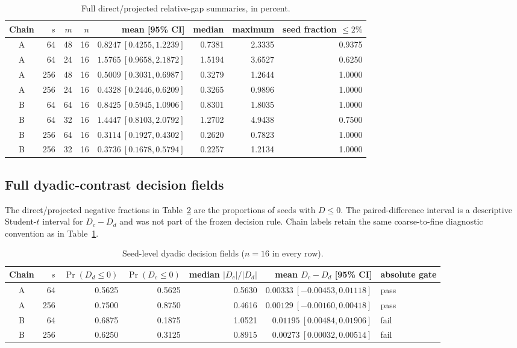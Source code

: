 \begin{table}[H]
\centering
\caption{Full direct/projected relative-gap summaries, in percent.}
\label{tab:r061-gap-full}
\scriptsize
\begin{tabular}{crrrrrrr}
\toprule
Chain & $s$ & $m$ & $n$ & mean [95\% CI] & median & maximum & seed fraction $\leq2\%$\\
\midrule
A & 64  & 48 & 16 & $0.8247\ [0.4255,1.2239]$ & 0.7381 & 2.3335 & 0.9375\\
A & 64  & 24 & 16 & $1.5765\ [0.9658,2.1872]$ & 1.5194 & 3.6527 & 0.6250\\
A & 256 & 48 & 16 & $0.5009\ [0.3031,0.6987]$ & 0.3279 & 1.2644 & 1.0000\\
A & 256 & 24 & 16 & $0.4328\ [0.2446,0.6209]$ & 0.3265 & 0.9896 & 1.0000\\
B & 64  & 64 & 16 & $0.8425\ [0.5945,1.0906]$ & 0.8301 & 1.8035 & 1.0000\\
B & 64  & 32 & 16 & $1.4447\ [0.8103,2.0792]$ & 1.2702 & 4.9438 & 0.7500\\
B & 256 & 64 & 16 & $0.3114\ [0.1927,0.4302]$ & 0.2620 & 0.7823 & 1.0000\\
B & 256 & 32 & 16 & $0.3736\ [0.1678,0.5794]$ & 0.2257 & 1.2134 & 1.0000\\
\bottomrule
\end{tabular}
\end{table}

\subsection{Full dyadic-contrast decision fields}

The direct/projected negative fractions in
Table~\ref{tab:r061-dyadic-full} are the proportions of seeds with $D\leq0$.
The paired-difference interval is a descriptive Student-$t$ interval for
$D_c-D_d$ and was not part of the frozen decision rule.  Chain labels retain
the same coarse-to-fine diagnostic convention as in
Table~\ref{tab:r061-gap-full}.

\begin{table}[H]
\centering
\caption{Seed-level dyadic decision fields ($n=16$ in every row).}
\label{tab:r061-dyadic-full}
\scriptsize
\begin{tabular}{crrrrrl}
\toprule
Chain & $s$ & $\Pr(D_d\leq0)$ & $\Pr(D_c\leq0)$
& median $|D_c|/|D_d|$ & mean $D_c-D_d$ [95\% CI] & absolute gate\\
\midrule
A & 64  & 0.5625 & 0.5625 & 0.5630 & $0.00333\ [-0.00453,0.01118]$ & pass\\
A & 256 & 0.7500 & 0.8750 & 0.4616 & $0.00129\ [-0.00160,0.00418]$ & pass\\
B & 64  & 0.6875 & 0.1875 & 1.0521 & $0.01195\ [0.00484,0.01906]$ & fail\\
B & 256 & 0.6250 & 0.3125 & 0.8915 & $0.00273\ [0.00032,0.00514]$ & fail\\
\bottomrule
\end{tabular}
\end{table}

